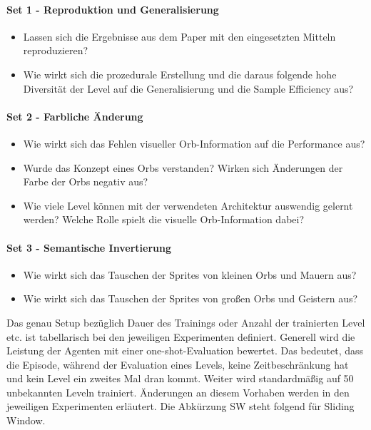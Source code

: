 \paragraph{Set 1 - Reproduktion und Generalisierung}\label{par_EXP_durch_fragen1}
\begin{itemize}
  \item Lassen sich die Ergebnisse aus dem Paper \cite{cobbe2019procgen} mit den eingesetzten Mitteln reproduzieren?
  \item Wie wirkt sich die prozedurale Erstellung und die daraus folgende hohe Diversität der Level auf die Generalisierung und die Sample Efficiency aus?
  \label{lst:itemList_EXP_durch_fragen1}
\end{itemize}
\paragraph{Set 2 - Farbliche Änderung}\label{par_EXP_durch_fragen2}
 \begin{itemize}
  \item Wie wirkt sich das Fehlen visueller Orb-Information auf die Performance aus? 
  \item Wurde das Konzept eines Orbs verstanden? Wirken sich Änderungen der Farbe der Orbs negativ aus? 
  \item Wie viele Level können mit der verwendeten Architektur auswendig gelernt werden? Welche Rolle spielt die visuelle Orb-Information dabei? 
  \label{lst:itemList_EXP_durch_fragen2}
\end{itemize}

\paragraph{Set 3 - Semantische Invertierung}\label{par_EXP_durch_fragen3}
\begin{itemize}
  \item Wie wirkt sich das Tauschen der Sprites von kleinen Orbs und Mauern aus?
  \item Wie wirkt sich das Tauschen der Sprites von großen Orbs und Geistern aus? \\ 
  \label{lst:itemList_EXP_durch_fragen3}
\end{itemize} 

Das genau Setup bezüglich Dauer des Trainings oder Anzahl der trainierten Level etc. ist tabellarisch bei den jeweiligen Experimenten definiert. 
Generell wird die Leistung der Agenten mit einer \dq one-shot\dq -Evaluation bewertet. Das bedeutet, dass die Episode, während der Evaluation eines Levels, keine Zeitbeschränkung hat und kein Level ein zweites Mal dran kommt. Weiter wird standardmäßig auf 50 unbekannten Leveln trainiert. Änderungen an diesem Vorhaben werden in den jeweiligen Experimenten erläutert. Die Abkürzung SW steht folgend für Sliding Window. 

